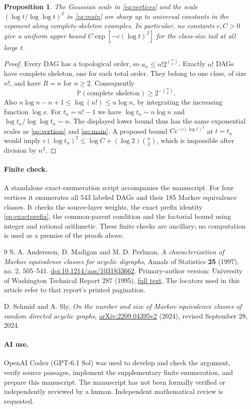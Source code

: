 \documentclass[11pt]{article}
\newtheorem{proposition}[theorem]{Proposition}
\theoremstyle{remark}
\newcommand{\Prob}{\mathbb P}
\begin{document}
\begin{proposition}\label{prop:sharp}
The Gaussian scale in \eqref{eq:vertices} and the scale
$(\log t/\log\log t)^2$ in \eqref{eq:main} are sharp up to universal
constants in the exponent along complete-skeleton examples. In particular,
no constants $c,C>0$ give a uniform upper bound
$C\exp[-c(\log t)^2]$ for the class-size tail at all large $t$.
\end{proposition}
\begin{proof}
Every DAG has a topological order, so $a_n\le n!2^{\binom n2}$.
Exactly $n!$ DAGs have complete skeleton, one for each total order.
They belong to one class, of size $n!$, and have $R=n$ for $n\ge2$.
Consequently
\[
 \Prob(\text{complete skeleton})\ge2^{-\binom n2}.
\]
Also $n\log n-n+1\le\log(n!)\le n\log n$, by integrating the
increasing function $\log x$. For $t_n=n!-1$ we have
$\log t_n\sim n\log n$ and
$\log t_n/\log\log t_n\sim n$. The displayed lower bound thus has
the same exponential scales as \eqref{eq:vertices} and \eqref{eq:main}.
A proposed bound $C e^{-c(\log t)^2}$ at $t=t_n$ would imply
$c(\log t_n)^2\le\log C+(\log2)\binom n2$, which is impossible
after division by $n^2$.
\end{proof}

\paragraph{Finite check.}
A standalone exact-enumeration script accompanies the manuscript.
For four vertices it enumerates all 543 labeled DAGs and their 185 Markov
equivalence classes. It checks the source-layer weights, the exact prefix
identity \eqref{eq:exactprefix}, the common-parent condition and the
factorial bound using integer and rational arithmetic. These finite checks
are ancillary; no computation is used as a premise of the proofs above.

\begin{thebibliography}{9}
S. A. Andersson, D. Madigan and M. D. Perlman,
\emph{A characterization of Markov equivalence classes for acyclic digraphs},
Annals of Statistics \textbf{25} (1997), no. 2, 505--541.
\href{https://doi.org/10.1214/aos/1031833662}{doi:10.1214/aos/1031833662}.
Primary-author version: University of Washington Technical Report 287 (1995),
\href{https://stat.uw.edu/sites/default/files/files/reports/1995/tr287.pdf}{full text}.
The locators used in this article refer to that report's printed pagination.

D. Schmid and A. Sly,
\emph{On the number and size of Markov equivalence classes of random
directed acyclic graphs},
\href{https://arxiv.org/abs/2209.04395v2}{arXiv:2209.04395v2} (2024),
revised September 28, 2024.
\end{thebibliography}

\paragraph{AI use.}
OpenAI Codex (GPT-6.1 Sol) was used to develop and check the argument,
verify source passages, implement the supplementary finite enumeration,
and prepare this manuscript. The manuscript has not been formally verified
or independently reviewed by a human. Independent mathematical review is
requested.
\end{document}
